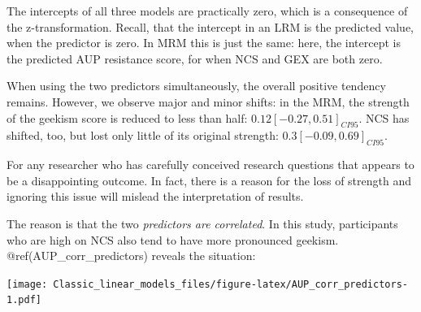 \documentclass[]{svmono}
\newenvironment{Shaded}{\begin{snugshade}}{\end{snugshade}}
\newcommand{\KeywordTok}[1]{\textcolor[rgb]{0.13,0.29,0.53}{\textbf{#1}}}
\newcommand{\DataTypeTok}[1]{\textcolor[rgb]{0.13,0.29,0.53}{#1}}
\newcommand{\DecValTok}[1]{\textcolor[rgb]{0.00,0.00,0.81}{#1}}
\newcommand{\StringTok}[1]{\textcolor[rgb]{0.31,0.60,0.02}{#1}}
\newcommand{\OperatorTok}[1]{\textcolor[rgb]{0.81,0.36,0.00}{\textbf{#1}}}
\newcommand{\NormalTok}[1]{#1}
\theoremstyle{definition}
\theoremstyle{definition}
\theoremstyle{definition}
\theoremstyle{remark}
\begin{document}
The intercepts of all three models are practically zero, which is a
consequence of the z-transformation. Recall, that the intercept in an
LRM is the predicted value, when the predictor is zero. In MRM this is
just the same: here, the intercept is the predicted AUP resistance
score, for when NCS and GEX are both zero.

When using the two predictors simultaneously, the overall positive
tendency remains. However, we observe major and minor shifts: in the
MRM, the strength of the geekism score is reduced to less than half:
\(0.12 [-0.27, 0.51]_{CI95}\). NCS has shifted, too, but lost only
little of its original strength: \(0.3 [-0.09, 0.69]_{CI95}\).

For any researcher who has carefully conceived research questions that
appears to be a disappointing outcome. In fact, there is a reason for
the loss of strength and ignoring this issue will mislead the
interpretation of results.

The reason is that the two \emph{predictors are correlated}. In this
study, participants who are high on NCS also tend to have more
pronounced geekism. @ref(AUP\_corr\_predictors) reveals the situation:

\begin{Shaded}
\end{Shaded}

\texttt{[image: Classic\_linear\_models\_files/figure-latex/AUP\_corr\_predictors-1.pdf]}
\end{document}
